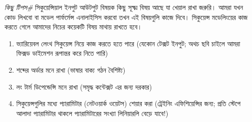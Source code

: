 \textit{কিছু টিপস\#}  সিকুয়েন্সিয়াল ইনপুট আউটপুট বিষয়ক কিছু সূক্ষ্ম বিষয় আছে যা খেয়াল রাখা জরুরি। আমরা যখন কোড লিখবো বা মডেল পার্ফর্মেন্স এনালাইসিস করবো তখন এই বিষয়গুলি কাজে দিবে।
সিকুয়েন্স মডেলিংয়ের কাজ করতে গেলে আমাদের নিচের কয়েকটি বিষয় মাথায় রাখতে হবে। 

\begin{enumerate}[label=(\roman*)]
\item ভ্যারিয়েবল লেংথ সিকুয়েন্স নিয়ে কাজ করতে হতে পারে (যেকোন টেক্সট ইনপুট;  অথচ ছবি চাইলে আমরা ফিক্সড ডাইমেশন রূপান্তর করে নিতে পারি) 
\item শব্দের অর্ডার মনে রাখা (ভাষার বাক্য গঠন বৈশিষ্ট্য) 
\item লং টার্ম ডিপেন্ডেন্সি মনে রাখা (সমৃদ্ধ কন্টেক্সট এর জন্য দরকার) 
\item সিকুয়েন্সগুলির মধ্যে প্যারামিটার (নেটওয়ার্ক ওয়েটস) শেয়ার করা (ট্রেইনিং এফিশিয়েন্সির জন্য; প্রতি স্টেপে আলাদা প্যারামিটার থাকলে প্যারামিটারের সংখ্যা লিনিয়ারলি বেড়ে যাবে!) 

\end{enumerate}